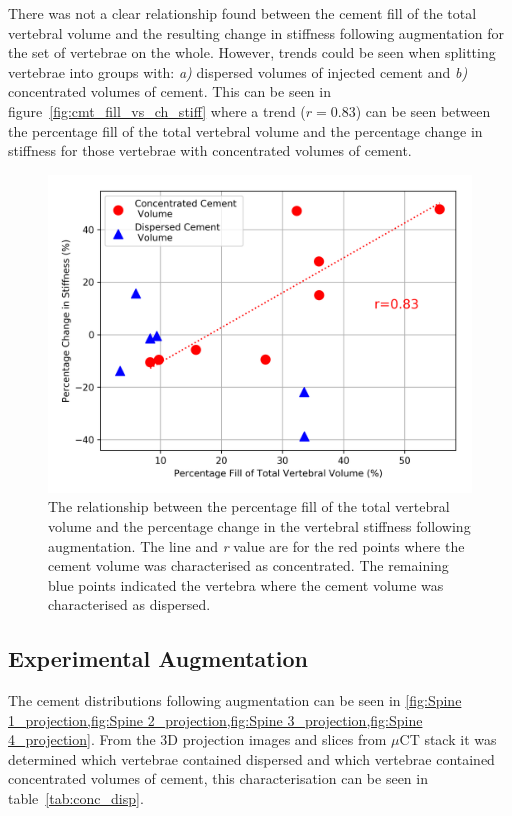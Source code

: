 There was not a clear relationship found between the cement fill of the total vertebral volume and the resulting change in stiffness following augmentation for the set of vertebrae on the whole.
However, trends could be seen when splitting vertebrae into groups with: \textit{a)} dispersed volumes of injected cement and \textit{b)} concentrated volumes of cement.
This can be seen in figure~\ref{fig:cmt_fill_vs_ch_stiff} where a trend ($r=0.83$) can be seen between the percentage fill of the total vertebral volume and the percentage change in stiffness for those vertebrae with concentrated volumes of cement.

\begin{figure}[h!]
  \centering
  \includegraphics[width=.7\textwidth]{Chapters/Chapter_HT_images/Aug_cmt_fill_vs_ch_stiff.png}
	\caption{The relationship between the percentage fill of the total vertebral volume and the percentage change in the vertebral stiffness following augmentation. The line and \textit{r} value are for the red points where the cement volume was characterised as concentrated. The remaining blue points indicated the vertebra where the cement volume was characterised as dispersed.}
  \label{fig:aug_cmt_fill_vs_ch_stiff}
\end{figure}

\subsection{Experimental Augmentation}

The cement distributions following augmentation can be seen in \cref{fig:Spine 1_projection,fig:Spine 2_projection,fig:Spine 3_projection,fig:Spine 4_projection}.
From the 3D projection images and slices from $\mu$CT stack it was determined which vertebrae contained dispersed and which vertebrae contained concentrated volumes of cement, this characterisation can be seen in table~\ref{tab:conc_disp}.



